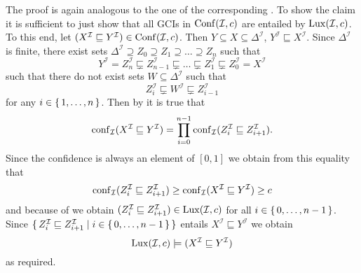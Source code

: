 \begin{Proof}
  The proof is again analogous to the one of the corresponding
  .  To show the claim it is sufficient to just show that all
  GCIs in $\operatorname{Conf}(\mathcal{I}, c)$ are entailed by $\operatorname{Lux}(\mathcal{I}, c)$.  To this end,
  let $(X^{\mathcal{I}} \sqsubseteq Y^{\mathcal{I}}) \in \operatorname{Conf}(\mathcal{I}, c)$.  Then $Y
  \subseteq X \subseteq \Delta^{\mathcal{I}}$, \ie $Y^{\mathcal{I}} \sqsubseteq
  X^{\mathcal{I}}$.  Since $\Delta^{\mathcal{I}}$ is finite, there exist sets
  $\Delta^{\mathcal{I}} \supseteq Z_0 \supseteq Z_1 \supseteq \dots \supseteq Z_n$ such
  that
  \begin{equation*}
    Y^{\mathcal{I}} = Z_n^{\mathcal{I}} \sqsubsetneq Z_{n-1}^{\mathcal{I}} \sqsubsetneq
    \dots \sqsubsetneq Z_1^{\mathcal{I}} \sqsubsetneq Z_0^{\mathcal{I}} = X^{\mathcal{I}}
  \end{equation*}
  such that there do not exist sets $W \subseteq \Delta^{\mathcal{I}}$ such that
  \begin{equation}
    \label{eq:25}
    Z_i^{\mathcal{I}} \sqsubsetneq W^{\mathcal{I}} \sqsubsetneq Z_{i-1}^{\mathcal{I}}
  \end{equation}
  for any $i \in {\ensuremath{\{\, 1, \dots, n \,\}}}$.  Then by
   it is true that
  \begin{equation*}
    \operatorname{conf}_{\mathcal{I}}(X^{\mathcal{I}} \sqsubseteq Y^{\mathcal{I}}) = \prod_{i = 0}^{n-1}
    \operatorname{conf}_{\mathcal{I}}(Z_i^{\mathcal{I}} \sqsubseteq Z_{i+1}^{\mathcal{I}}).
  \end{equation*}
  Since the confidence is always an element of $[0,1]$ we obtain from this equality that
  \begin{equation*}
    \operatorname{conf}_{\mathcal{I}}(Z_i^{\mathcal{I}} \sqsubseteq Z_{i+1}^{\mathcal{I}}) \ge
    \operatorname{conf}_{\mathcal{I}}(X^{\mathcal{I}} \sqsubseteq Y^{\mathcal{I}}) \ge c
  \end{equation*}
  and because of  we obtain $(Z_i^{\mathcal{I}} \sqsubseteq
  Z_{i+1}^{\mathcal{I}}) \in \operatorname{Lux}(\mathcal{I}, c)$ for all $i \in {\ensuremath{\{\, 0, \dots, n-1\,\}}}$.
  Since ${\{\, Z_i^{\mathcal{I}} \sqsubseteq Z_{i+1}^{\mathcal{I}} \mid i \in {\ensuremath{\{\, 0,
      \dots, n-1\,\}}} \,\}}$ entails $X^{\mathcal{I}} \sqsubseteq Y^{\mathcal{I}}$ we obtain
  \begin{equation*}
    \operatorname{Lux}(\mathcal{I}, c) \models (X^{\mathcal{I}} \sqsubseteq Y^{\mathcal{I}})
  \end{equation*}
  as required.
\end{Proof}

